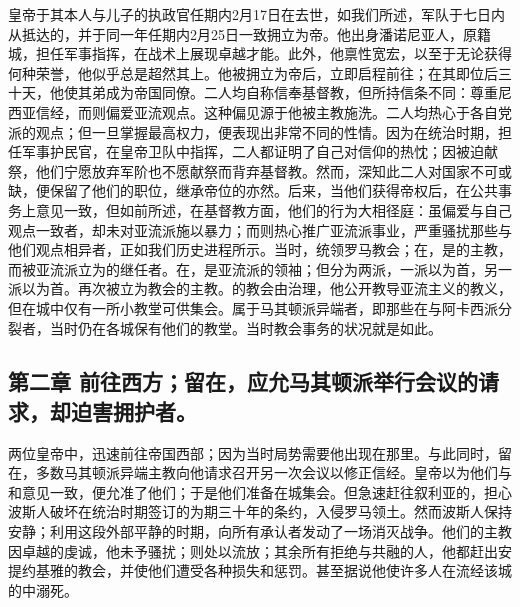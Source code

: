 皇帝于其本人与儿子的执政官任期内2月17日在去世，如我们所述，军队于七日内从抵达的，并于同一年任期内2月25日一致拥立为帝。他出身潘诺尼亚人，原籍城，担任军事指挥，在战术上展现卓越才能。此外，他禀性宽宏，以至于无论获得何种荣誉，他似乎总是超然其上。他被拥立为帝后，立即启程前往；在其即位后三十天，他使其弟成为帝国同僚。二人均自称信奉基督教，但所持信条不同：尊重尼西亚信经，而则偏爱亚流观点。这种偏见源于他被主教施洗。二人均热心于各自党派的观点；但一旦掌握最高权力，便表现出非常不同的性情。因为在统治时期，担任军事护民官，在皇帝卫队中指挥，二人都证明了自己对信仰的热忱；因被迫献祭，他们宁愿放弃军阶也不愿献祭而背弃基督教。然而，深知此二人对国家不可或缺，便保留了他们的职位，继承帝位的亦然。后来，当他们获得帝权后，在公共事务上意见一致，但如前所述，在基督教方面，他们的行为大相径庭：虽偏爱与自己观点一致者，却未对亚流派施以暴力；而则热心推广亚流派事业，严重骚扰那些与他们观点相异者，正如我们历史进程所示。当时，统领罗马教会；在，是的主教，而被亚流派立为的继任者。在，是亚流派的领袖；但分为两派，一派以为首，另一派以为首。再次被立为教会的主教。的教会由治理，他公开教导亚流主义的教义，但在城中仅有一所小教堂可供集会。属于马其顿派异端者，即那些在与阿卡西派分裂者，当时仍在各城保有他们的教堂。当时教会事务的状况就是如此。\par


\subsection{第二章 前往西方；留在，应允马其顿派举行会议的请求，却迫害拥护者。}

两位皇帝中，迅速前往帝国西部；因为当时局势需要他出现在那里。与此同时，留在，多数马其顿派异端主教向他请求召开另一次会议以修正信经。皇帝以为他们与和意见一致，便允准了他们；于是他们准备在城集会。但急速赶往叙利亚的，担心波斯人破坏在统治时期签订的为期三十年的条约，入侵罗马领土。然而波斯人保持安静；利用这段外部平静的时期，向所有承认者发动了一场消灭战争。他们的主教因卓越的虔诚，他未予骚扰；则处以流放；其余所有拒绝与共融的人，他都赶出安提约基雅的教会，并使他们遭受各种损失和惩罚。甚至据说他使许多人在流经该城的中溺死。\par

